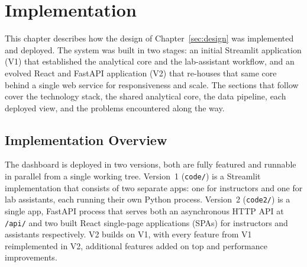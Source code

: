 \section{Implementation} \label{sec:implementation}

This chapter describes how the design of Chapter~\ref{sec:design} was implemented and deployed. 
The system was built in two stages: an initial Streamlit application (V1) that established the analytical core and the lab-assistant workflow, and an evolved React and FastAPI application (V2) that re-houses that same core behind a single web service for responsiveness and scale. 
The sections that follow cover the technology stack, the shared analytical core, the data pipeline, each deployed view, and the problems encountered along the way.


\subsection{Implementation Overview} \label{sec:overview}

The dashboard is deployed in two versions, both are fully featured and runnable in parallel from a single working tree. 
Version~1 (\texttt{code/}) is a Streamlit implementation that consists of two separate apps: one for instructors and one for lab assistants, each running their own Python process. 
Version~2 (\texttt{code2/}) is a single app, FastAPI process that serves both an asynchronous HTTP API at \texttt{/api/} and two built React single-page applications (SPAs) for instructors and assistants respectively. 
V2 builds on V1, with every feature from V1 reimplemented in V2, additional features added on top and performance improvements.

